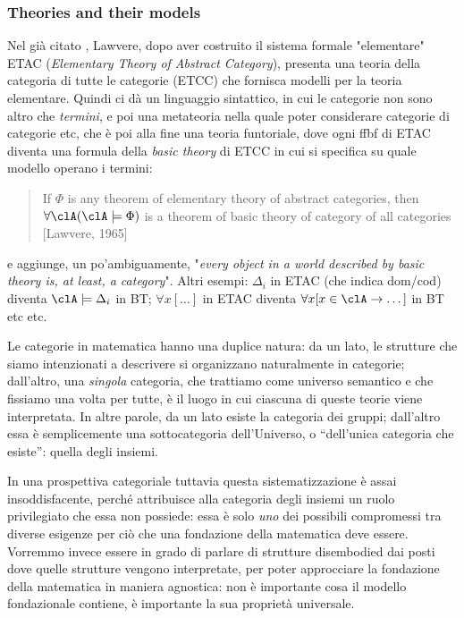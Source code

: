 \subsubsection{Theories and their models}
Nel già citato \cite{lajolla}, Lawvere, dopo aver costruito il sistema formale "elementare" ETAC (\emph{Elementary Theory of Abstract Category}), presenta una teoria della categoria di tutte le categorie (ETCC) che fornisca modelli per la teoria elementare. Quindi ci dà un linguaggio sintattico, in cui le categorie non sono altro che \emph{termini}, e poi una metateoria nella quale poter considerare categorie di categorie etc, che è poi alla fine una teoria funtoriale, dove ogni ffbf di ETAC diventa una formula della \emph{basic theory} di ETCC in cui si specifica su quale modello operano i termini:
\begin{quote}
	If $\Phi$ is any theorem of elementary theory of abstract categories, then $ \forall \clA (\clA \models \Phi)$ is a theorem of basic theory of category of all categories [Lawvere, 1965]
\end{quote}
e aggiunge, un po'ambiguamente, "\textit{every object in a world described by basic theory is, at least, a category}". Altri esempi: $\Delta_i$ in ETAC (che indica dom/cod) diventa $\clA \models \Delta_i$ in BT; $\forall x [\dots]$ in ETAC diventa $\forall x [x \in \clA \rightarrow \dots]$ in BT etc etc.

Le categorie in matematica hanno una duplice natura: da un lato, le strutture che siamo intenzionati a descrivere si organizzano naturalmente in categorie; dall'altro, una \emph{singola} categoria, che trattiamo come universo semantico e che fissiamo una volta per tutte, è il luogo in cui ciascuna di queste teorie viene interpretata. In altre parole, da un lato esiste la categoria dei gruppi; dall'altro essa è semplicemente una sottocategoria dell'Universo, o ``dell'unica categoria che esiste'': quella degli insiemi.

In una prospettiva categoriale tuttavia questa sistematizzazione è assai insoddisfacente, perché attribuisce alla categoria degli insiemi un ruolo privilegiato che essa non possiede: essa è solo \emph{uno} dei possibili compromessi tra diverse esigenze per ciò che una fondazione della matematica deve essere. Vorremmo invece essere in grado di parlare di strutture disembodied dai posti dove quelle strutture vengono interpretate, per poter approcciare la fondazione della matematica in maniera agnostica: non è importante cosa il modello fondazionale contiene, è importante la sua proprietà universale.

